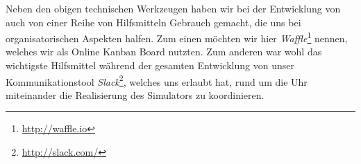 \pagebreak
Neben den obigen technischen Werkzeugen haben wir bei der Entwicklung von
\erasim{} auch von einer Reihe von Hilfsmitteln Gebrauch gemacht, die uns bei
organisatorischen Aspekten halfen. Zum einen möchten wir hier
\emph{Waffle}\footnote{\url{http://waffle.io}} nennen, welches wir als Online
Kanban Board nutzten. Zum anderen war wohl das wichtigste Hilfsmittel während
der gesamten Entwicklung von \erasim{} unser Kommunikationstool
\emph{Slack}\footnote{\url{http://slack.com/}}, welches uns erlaubt hat, rund um
die Uhr miteinander die Realisierung des Simulators zu koordinieren.
